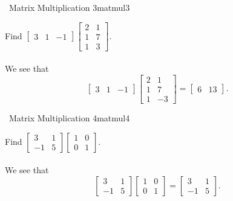         \begin{example}{\Difficulty\,\Difficulty\,\,Matrix Multiplication 3}{matmul3}
        
            Find \(\begin{bmatrix} 3 & 1 & -1 \end{bmatrix}\begin{bmatrix} 2 & 1 \\ 1 & 7 \\ 1 & 3 \end{bmatrix}\).
            \\
            \\
            We see that
            \begin{equation*}
               \begin{bmatrix} 3 & 1 & -1 \end{bmatrix}\begin{bmatrix} 2 & 1 \\ 1 & 7 \\ 1 & -3 \end{bmatrix}=\begin{bmatrix} 6 & 13 \end{bmatrix}.
            \end{equation*}
                
        \end{example}
        \begin{example}{\Difficulty\,\Difficulty\,\,Matrix Multiplication 4}{matmul4}
        
            Find \(\begin{bmatrix} 3 & 1 \\ -1 & 5 \end{bmatrix}\begin{bmatrix} 1 & 0 \\ 0 & 1 \end{bmatrix}\).
            \\
            \\
            We see that
            \begin{equation*}
               \begin{bmatrix} 3 & 1 \\ -1 & 5 \end{bmatrix}\begin{bmatrix} 1 & 0 \\ 0 & 1 \end{bmatrix}=\begin{bmatrix} 3 & 1 \\ -1 & 5 \end{bmatrix}.
            \end{equation*}
                
        \end{example}
